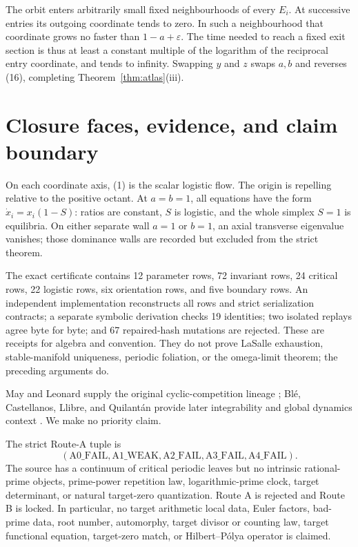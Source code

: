 \documentclass[10pt]{article}
\theoremstyle{remark}
\begin{document}
The orbit enters arbitrarily small fixed neighbourhoods of every $E_i$.
At successive entries its outgoing coordinate tends to zero.  In such a
neighbourhood that coordinate grows no faster than
$1-a+\varepsilon$.  The time needed to reach a fixed exit section is thus at
least a constant multiple of the logarithm of the reciprocal entry
coordinate, and tends to infinity.  Swapping $y$ and $z$ swaps $a,b$ and
reverses (16), completing Theorem~\ref{thm:atlas}(iii).

\section{Closure faces, evidence, and claim boundary}

On each coordinate axis, (1) is the scalar logistic flow.  The origin is
repelling relative to the positive octant.  At $a=b=1$, all equations have
the form $\dot x_i=x_i(1-S)$: ratios are constant, $S$ is logistic, and the
whole simplex $S=1$ is equilibria.  On either separate wall $a=1$ or $b=1$,
an axial transverse eigenvalue vanishes; those dominance walls are recorded
but excluded from the strict theorem.

The exact certificate contains 12 parameter rows, 72 invariant rows, 24
critical rows, 22 logistic rows, six orientation rows, and five boundary
rows.  An independent implementation reconstructs all rows and strict
serialization contracts; a separate symbolic derivation checks 19
identities; two isolated replays agree byte for byte; and 67 repaired-hash
mutations are rejected.  These are receipts for algebra and convention.
They do not prove LaSalle exhaustion, stable-manifold uniqueness, periodic
foliation, or the omega-limit theorem; the preceding arguments do.

May and Leonard supply the original cyclic-competition lineage
\cite{mayleonard}; Bl\'e, Castellanos, Llibre, and Quilant\'an provide later
integrability and global dynamics context \cite{bleetal}.  We make no
priority claim.

The strict Route-A tuple is
\[
 (\mathrm{A0\_FAIL},\mathrm{A1\_WEAK},\mathrm{A2\_FAIL},
  \mathrm{A3\_FAIL},\mathrm{A4\_FAIL}).
\]
The source has a continuum of critical periodic leaves but no intrinsic
rational-prime objects, prime-power repetition law, logarithmic-prime clock,
target determinant, or natural target-zero quantization.  Route A is rejected
and Route B is locked.  In particular, no target arithmetic local data,
Euler factors, bad-prime data, root number, automorphy, target divisor or
counting law, target functional equation, target-zero match, or
Hilbert--P\'olya operator is claimed.
\end{document}
